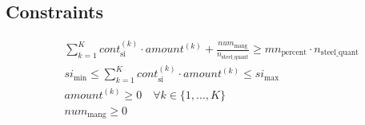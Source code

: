 \documentclass{article}
\begin{document}
\subsection*{Constraints}
\begin{align}
    & \sum_{k=1}^{K} cont_{\text{si}}^{(k)} \cdot amount^{(k)} + \frac{num_{\text{mang}}}{n_{\text{steel\_quant}}} \geq mn_{\text{percent}} \cdot n_{\text{steel\_quant}} \tag{Mn requirement} \\
    & si_{\text{min}} \leq \sum_{k=1}^{K} cont_{\text{si}}^{(k)} \cdot amount^{(k)} \leq si_{\text{max}} \tag{Si requirement} \\
    & amount^{(k)} \geq 0 \quad \forall k \in \{1, \ldots, K\} \tag{Non-negativity} \\
    & num_{\text{mang}} \geq 0 \tag{Non-negativity for manganese}
\end{align}
\end{document}
